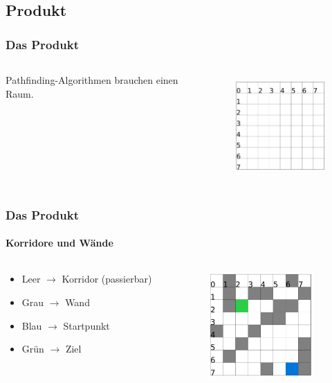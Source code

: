 \documentclass[professionalfont,serif,german]{beamer}
\begin{document}
\begin{frame}
  \section{Produkt}
  \frametitle{Das Produkt}
    \begin{columns}
      \begin{column}[T]{0.5\textwidth}
        Pathfinding-Algorithmen brauchen einen Raum.
      \end{column}
      \begin{column}[T]{0.5\textwidth}
        \begin{figure}
          \includegraphics[height=4cm]{img/grid1.png}
        \end{figure}
      \end{column}
    \end{columns}
\end{frame}

\begin{frame}
  \frametitle{Das Produkt}
  \framesubtitle{Korridore und Wände}
  \begin{columns}
    \begin{column}[T]{0.5\textwidth}
      \begin{itemize}
        \item Leer $\rightarrow$ Korridor (passierbar)
        \item Grau $\rightarrow$ Wand
        \item Blau $\rightarrow$ Startpunkt
        \item Grün $\rightarrow$ Ziel
      \end{itemize}
    \end{column}
    \begin{column}[T]{0.5\textwidth}
      \begin{figure}
        \includegraphics[height=4cm]{img/grid2.png}
      \end{figure}
    \end{column}
  \end{columns}
\end{frame}
\end{document}
